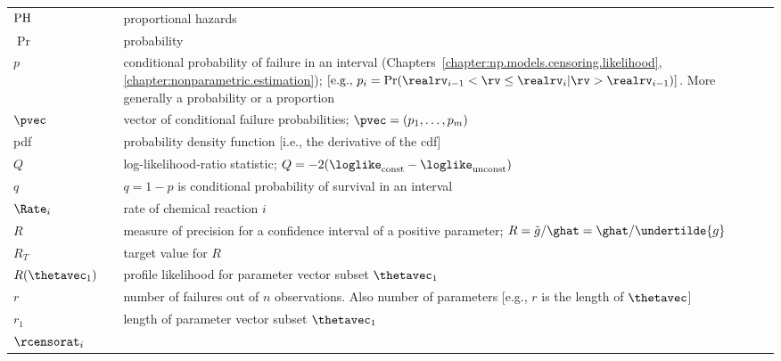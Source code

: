 \begin{supertabular}{p{0.9in}lp{4.0in}}
${\rm PH}$     &
          &
proportional hazards 
\\
$\Pr$     &
          &
probability
   \\ 
${p}$     &
          &
conditional probability of failure in an interval
(Chapters~\ref{chapter:np.models.censoring.likelihood},
\ref{chapter:nonparametric.estimation});
\newline
$\left [\mbox{e.g.,}\,\, p_{i}=\Pr(\realrv_{i-1} < \rv \leq \realrv_{i} |
       \rv > \realrv_{i-1})\right ]$.
More generally a probability or a proportion
  \\
${\pvec}$ &
&vector of conditional failure probabilities;
$\pvec=(p_{1}, \ldots, p_{m})$
  \\
pdf &
&
probability density function [i.e., the derivative
of the cdf]
\\
$Q$  & & log-likelihood-ratio statistic;
$Q=-2(\loglike_{\rm const}-\loglike_{\rm unconst})$
  \\
$q$  & & ${q=1-p}$ is conditional probability of
survival in an interval
  \\
$\Rate_{i}$ & 
& rate of chemical reaction $i$
    \\
$R$ &
    &
measure of precision for a confidence interval 
of a positive parameter;
$R=\tilde{g}/\ghat=
\ghat/\undertilde{g}$ 
   \\
$R_{T}$ &
    &
target value for $R$
   \\
$R(\thetavec_{1})$ &
                   &
profile likelihood  for parameter vector subset $\thetavec_{1}$ 
   \\
$r$ &
&number of failures out of $n$ observations.
Also number of parameters [e.g., $r$ is the 
length of $\thetavec$]
   \\
$r_{1}$ &
&
length of parameter vector subset $\thetavec_{1}$
   \\
$\rcensorat_{i}$ &

\end{supertabular}
